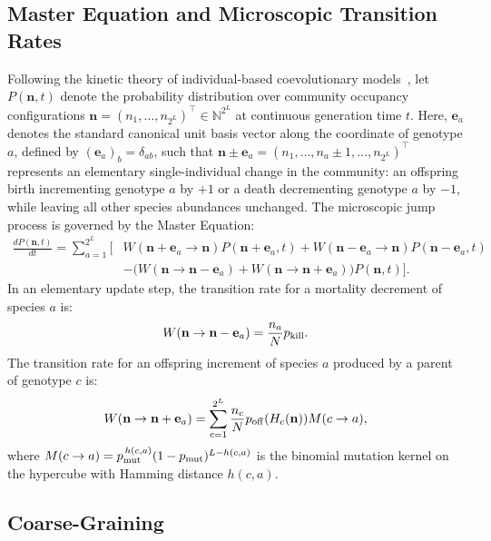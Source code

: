 \documentclass[11pt,a4paper]{article}
\newcommand{\pk}{p_{\rm kill}}
\newcommand{\pmut}{p_{\rm mut}}
\newcommand{\poff}{p_{\rm off}}
\begin{document}
\subsection{Master Equation and Microscopic Transition Rates}

Following the kinetic theory of individual-based coevolutionary models~\cite{cairoli2014forecasting,piovani2016linear}, let $P(\mathbf{n}, t)$ denote the probability distribution over community occupancy configurations $\mathbf{n} = (n_1, \dots, n_{2^L})^\top \in \mathbb{N}^{2^L}$ at continuous generation time $t$. Here, $\mathbf{e}_a$ denotes the standard canonical unit basis vector along the coordinate of genotype $a$, defined by $(\mathbf{e}_a)_b = \delta_{ab}$, such that $\mathbf{n} \pm \mathbf{e}_a = (n_1, \dots, n_a \pm 1, \dots, n_{2^L})^\top$ represents an elementary single-individual change in the community: an offspring birth incrementing genotype $a$ by $+1$ or a death decrementing genotype $a$ by $-1$, while leaving all other species abundances unchanged. The microscopic jump process is governed by the Master Equation:
\begin{equation}
\begin{split}
\frac{d P(\mathbf{n}, t)}{dt} = \sum_{a=1}^{2^L} \Big[ & W(\mathbf{n} + \mathbf{e}_a \to \mathbf{n}) P(\mathbf{n} + \mathbf{e}_a, t) + W(\mathbf{n} - \mathbf{e}_a \to \mathbf{n}) P(\mathbf{n} - \mathbf{e}_a, t) \\
& - \Big( W(\mathbf{n} \to \mathbf{n} - \mathbf{e}_a) + W(\mathbf{n} \to \mathbf{n} + \mathbf{e}_a) \Big) P(\mathbf{n}, t) \Big].
\end{split}
\label{eq:master_eq}
\end{equation}
In an elementary update step, the transition rate for a mortality decrement of species $a$ is:
\begin{equation}
W(\mathbf{n} \to \mathbf{n} - \mathbf{e}_a) = \frac{n_a}{N} \pk.
\end{equation}
The transition rate for an offspring increment of species $a$ produced by a parent of genotype $c$ is:
\begin{equation}
W(\mathbf{n} \to \mathbf{n} + \mathbf{e}_a) = \sum_{c=1}^{2^L} \frac{n_c}{N} \poff(H_c(\mathbf{n})) M(c \to a),
\end{equation}
where $M(c \to a) = \pmut^{\,h(c,a)} (1 - \pmut)^{L - h(c,a)}$ is the binomial mutation kernel on the hypercube with Hamming distance $h(c,a)$.

\subsection{Coarse-Graining}
\end{document}
